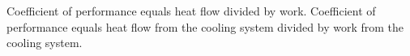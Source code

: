 Coefficient of performance equals heat flow divided by work.  
Coefficient of performance equals heat flow from the cooling system divided by work from the cooling system.